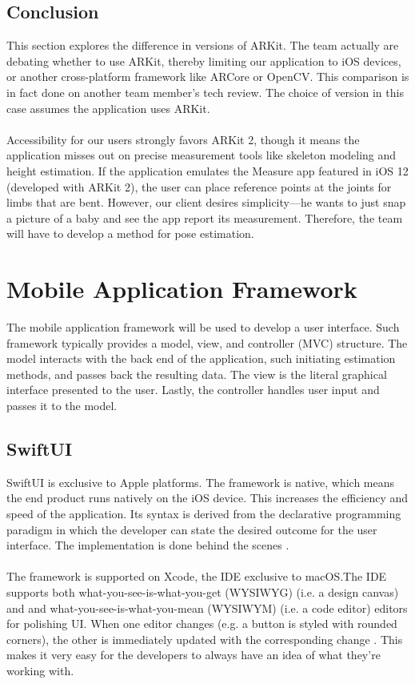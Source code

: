 \documentclass[onecolumn, draftclsnofoot,10pt, compsoc]{IEEEtran}
\begin{document}
\subsection{Conclusion}
This section explores the difference in versions of ARKit. The team actually are debating whether to use ARKit, thereby limiting our application to iOS devices, or another cross-platform framework like ARCore or OpenCV. This comparison is in fact done on another team member's tech review. The choice of version in this case assumes the application uses ARKit.
\\\\
Accessibility for our users strongly favors ARKit 2, though it means the application misses out on precise measurement tools like skeleton modeling and height estimation.
If the application emulates the Measure app featured in iOS 12 (developed with ARKit 2), the user can place reference points at the joints for limbs that are bent.
However, our client desires simplicity---he wants to just snap a picture of a baby and see the app report its measurement. Therefore, the team will have to develop a method for pose estimation.


\section{Mobile Application Framework}
The mobile application framework will be used to develop a user interface. Such framework typically provides a model, view, and controller (MVC) structure. The model interacts with the back end of the application, such initiating estimation methods, and passes back the resulting data. The view is the literal graphical interface presented to the user. Lastly, the controller handles user input and passes it to the model.

\subsection{SwiftUI}
SwiftUI is exclusive to Apple platforms. The framework is native, which means the end product runs natively on the iOS device. This increases the efficiency and speed of the application.
Its syntax is derived from the declarative programming paradigm in which the developer can state the desired outcome for the user interface. The implementation is done behind the scenes \cite{swiftui}.
\\\\
The framework is supported on Xcode, the IDE exclusive to macOS.The IDE supports both what-you-see-is-what-you-get (WYSIWYG) (i.e. a design canvas) and and what-you-see-is-what-you-mean (WYSIWYM) (i.e. a code editor) editors for polishing UI. When one editor changes (e.g. a button is styled with rounded corners), the other is immediately updated with the corresponding change \cite{swiftui}.
This makes it very easy for the developers to always have an idea of what they're working with.
\end{document}
